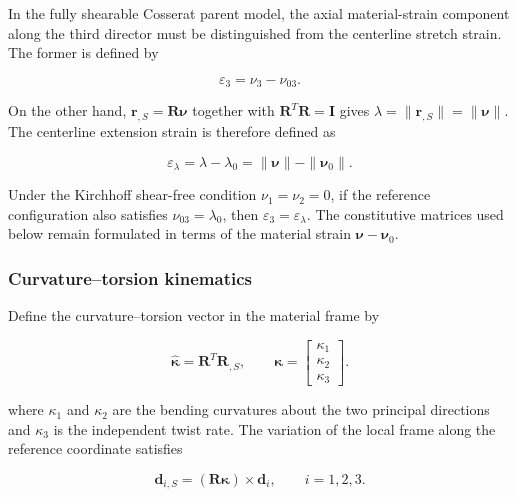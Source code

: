 In the fully shearable Cosserat parent model, the axial material-strain component along the third director must be distinguished from the centerline stretch strain. The former is defined by

\begin{equation}
\label{eq:rod-1-11}
\varepsilon_{3} = \nu_{3} - \nu_{03}.
\end{equation}

On the other hand, \(\mathbf{r}_{,S} = \mathbf{R}\bm{\nu}\) together with \(\mathbf{R}^{T}\mathbf{R} = \mathbf{I}\) gives \(\lambda = \parallel \mathbf{r}_{,S} \parallel = \parallel \bm{\nu} \parallel\). The centerline extension strain is therefore defined as

\begin{equation}
\label{eq:rod-1-12}
\varepsilon_{\lambda} = \lambda - \lambda_{0} = \parallel \bm{\nu} \parallel - \parallel \bm{\nu}_{0} \parallel .
\end{equation}

Under the Kirchhoff shear-free condition \(\nu_{1} = \nu_{2} = 0\), if the reference configuration also satisfies \(\nu_{03} = \lambda_{0}\), then \(\varepsilon_{3} = \varepsilon_{\lambda}\). The constitutive matrices used below remain formulated in terms of the material strain \(\bm{\nu} - \bm{\nu}_{0}\).

\subsubsection{Curvature--torsion kinematics}\label{sec:rod-1-2-4}

Define the curvature--torsion vector in the material frame by

\begin{equation}
\label{eq:rod-1-13}
\widehat{\bm{\kappa}} = \mathbf{R}^{T}\mathbf{R}_{,S},\quad\quad\bm{\kappa} = \begin{bmatrix}
\kappa_{1} \\
\kappa_{2} \\
\kappa_{3}
\end{bmatrix}.
\end{equation}

where \(\kappa_{1}\) and \(\kappa_{2}\) are the bending curvatures about the two principal directions and \(\kappa_{3}\) is the independent twist rate. The variation of the local frame along the reference coordinate satisfies

\begin{equation}
\label{eq:rod-1-14}
\mathbf{d}_{i,S} = \left( \mathbf{R}\bm{\kappa} \right) \times \mathbf{d}_{i},\quad\quad i = 1,2,3.
\end{equation}

